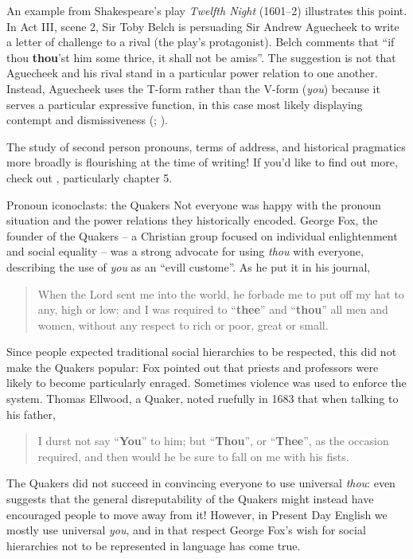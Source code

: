 An example from Shakespeare's play \textit{Twelfth Night} (1601--2) illustrates this point. In Act III, scene 2, Sir Toby Belch is persuading Sir Andrew Aguecheek to write a letter of challenge to a rival (the play's protagonist). Belch comments that ``if thou \textbf{thou}'st him some thrice, it shall not be amiss''. The suggestion is not that Aguecheek and his rival stand in a particular power relation to one another. Instead, Aguecheek uses the T-form rather than the V-form (\textit{you}) because it serves a particular expressive function, in this case most likely displaying contempt and dismissiveness (\citealp{BrownGilman1960}; \citealp[83]{JuckerTaavitsainen2013}).

The study of second person pronouns, terms of address, and historical pragmatics more broadly is flourishing at the time of writing! If you'd like to find out more, check out \citet{JuckerTaavitsainen2013}, particularly chapter 5.


\begin{peoplebox}{Pronoun iconoclasts: the Quakers}
Not everyone was happy with the pronoun situation and the power relations they historically encoded. George Fox, the founder of the Quakers -- a Christian group focused on individual enlightenment and social equality -- was a strong advocate for using \textit{thou} with everyone, describing the use of \textit{you} as an ``evill custome''. As he put it in his journal, 
\begin{quote}
    When the Lord sent me into the world, he forbade me to put off my hat to any, high or low: and I was required to ``\textbf{thee}'' and ``\textbf{thou}'' all men and women, without any respect to rich or poor, great or small.
\end{quote}
Since people expected traditional social hierarchies to be respected, this did not make the Quakers popular: Fox pointed out that priests and professors were likely to become particularly enraged. Sometimes violence was used to enforce the system. Thomas Ellwood, a Quaker, noted ruefully in 1683 that when talking to his father, \begin{quote}
    I durst not say ``\textbf{You}'' to him; but ``\textbf{Thou}'', or ``\textbf{Thee}'', as the occasion required, and then would he be sure to fall on me with his fists.
\end{quote}
The Quakers did not succeed in convincing everyone to use universal \textit{thou}: \citet[107]{Leith1997} even suggests that the general disreputability of the Quakers might instead have encouraged people to move away from it! However, in Present Day English we mostly use universal \textit{you}, and in that respect George Fox's wish for social hierarchies not to be represented in language has come true.
\end{peoplebox}


